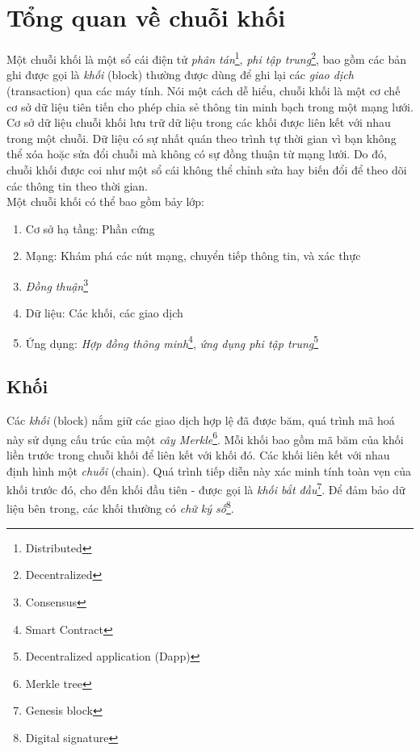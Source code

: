 \section{Tổng quan về chuỗi khối}

Một chuỗi khối là một sổ cái điện tử \textit{phân tán}\footnote{Distributed}, \textit{phi tập trung}\footnote{Decentralized}, bao gồm các bản ghi được gọi là \textit{khối} (block) thường được dùng để ghi lại các \textit{giao dịch} (transaction) qua các máy tính. Nói một cách dễ hiểu, chuỗi khối là một cơ chế cơ sở dữ liệu tiên tiến cho phép chia sẻ thông tin minh bạch trong một mạng lưới. Cơ sở dữ liệu chuỗi khối lưu trữ dữ liệu trong các khối được liên kết với nhau trong một chuỗi. Dữ liệu có sự nhất quán theo trình tự thời gian vì bạn không thể xóa hoặc sửa đổi chuỗi mà không có sự đồng thuận từ mạng lưới. Do đó, chuỗi khối được coi như một sổ cái không thể chỉnh sửa hay biến đổi để theo dõi các thông tin theo thời gian.\\

Một chuỗi khối có thể bao gồm bảy lớp:
\begin{enumerate}
    \item Cơ sở hạ tầng: Phần cứng
    \item Mạng: Khám phá các nút mạng, chuyển tiếp thông tin, và xác thực
    \item \textit{Đồng thuận}\footnote{Consensus}
    \item Dữ liệu: Các khối, các giao dịch
    \item Ứng dụng: \textit{Hợp đồng thông minh}\footnote{Smart Contract}, \textit{ứng dụng phi tập trung}\footnote{Decentralized application (Dapp)}
\end{enumerate}

\subsection{Khối}

Các \textit{khối} (block) nắm giữ các giao dịch hợp lệ đã được băm, quá trình mã hoá này sử dụng cấu trúc của một \textit{cây Merkle}\footnote{Merkle tree}. Mỗi khối bao gồm mã băm của khối liền trước trong chuỗi khối để liên kết với khối đó. Các khối liên kết với nhau định hình một \textit{chuỗi} (chain). Quá trình tiếp diễn này xác minh tính toàn vẹn của khối trước đó, cho đến khối đầu tiên - được gọi là \textit{khối bắt đầu}\footnote{Genesis block}. Để đảm bảo dữ liệu bên trong, các khối thường có \textit{chữ ký số}\footnote{Digital signature}.\\

